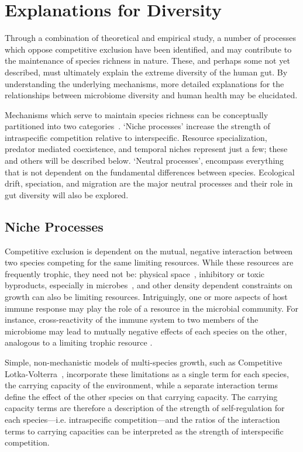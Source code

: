 \documentclass[12pt]{article}
\begin{document}
\section{Explanations for Diversity}
Through a combination of theoretical and empirical study, a number of
processes which oppose competitive exclusion have been identified,
and may contribute to the maintenance of species richness in nature.
These, and perhaps some not yet described,
must ultimately explain the extreme diversity of the human gut.
By understanding the underlying mechanisms,
more detailed explanations for the relationships between microbiome
diversity and human health may be elucidated.

Mechanisms which serve to maintain species richness can be conceptually
partitioned into two categories~\citep{Vellend2010}.
`Niche processes' increase the strength of intraspecific competition
relative to interspecific.
Resource specialization, predator mediated coexistence, and temporal niches
represent just a few;
these and others will be described below.
`Neutral processes', encompass everything that is not dependent on the
fundamental differences between species.
Ecological drift, speciation, and migration are the major neutral processes
and their role in gut diversity will also be explored.

\subsection{Niche Processes}
Competitive exclusion is dependent on the mutual, negative interaction
between two species competing for the same limiting resources.
While these resources are frequently trophic, they need not be:
physical space~\citep{Hastings1980,Paine1971},
inhibitory or toxic byproducts, especially in microbes~\citep{MacLean2008},
and other density dependent constraints on growth
can also be limiting resources.
Intriguingly, one or more aspects of host immune response may
play the role of a resource in the microbial community.
For instance, cross-reactivity of the immune system to two members
of the microbiome may lead to mutually negative effects of each
species on the other, analogous to a limiting trophic resource
\citep[For a review of the interaction
       of the microbiota with the immune system:][]{Brestoff2013}.

Simple, non-mechanistic models of multi-species growth,
such as Competitive Lotka-Volterra~\citep{Lotka1925,Volterra1928},
incorporate these limitations as a single term for each species,
the carrying capacity of the environment,
while a separate interaction terms define the effect of the other species
on that carrying capacity.
The carrying capacity terms are therefore a description of the strength
of self-regulation for each species---i.e\@. intraspecific competition---and
the ratios of the interaction terms to carrying capacities can
be interpreted as the strength of interspecific competition.
\end{document}
